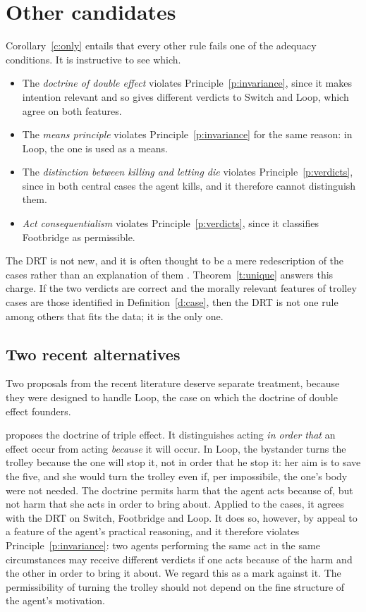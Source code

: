 \documentclass{situationist-preprint}
\begin{document}
\section{Other candidates}

Corollary~\ref{c:only} entails that every other rule fails one of the adequacy conditions. It is instructive to see which.

\begin{itemize}
\item The \emph{doctrine of double effect} violates Principle~\ref{p:invariance}, since it makes intention relevant and so gives different verdicts to Switch and Loop, which agree on both features.
\item The \emph{means principle} violates Principle~\ref{p:invariance} for the same reason: in Loop, the one is used as a means.
\item The \emph{distinction between killing and letting die} violates Principle~\ref{p:verdicts}, since in both central cases the agent kills, and it therefore cannot distinguish them.
\item \emph{Act consequentialism} violates Principle~\ref{p:verdicts}, since it classifies Footbridge as permissible.
\end{itemize}

The DRT is not new, and it is often thought to be a mere redescription of the cases rather than an explanation of them \citep{Kamm2007,Thomson2008}. Theorem~\ref{t:unique} answers this charge. If the two verdicts are correct and the morally relevant features of trolley cases are those identified in Definition~\ref{d:case}, then the DRT is not one rule among others that fits the data; it is the only one.

\subsection{Two recent alternatives}

Two proposals from the recent literature deserve separate treatment, because they were designed to handle Loop, the case on which the doctrine of double effect founders.

\citet{Kamm2007} proposes the doctrine of triple effect. It distinguishes acting \emph{in order that} an effect occur from acting \emph{because} it will occur. In Loop, the bystander turns the trolley because the one will stop it, not in order that he stop it: her aim is to save the five, and she would turn the trolley even if, per impossibile, the one's body were not needed. The doctrine permits harm that the agent acts because of, but not harm that she acts in order to bring about. Applied to the cases, it agrees with the DRT on Switch, Footbridge and Loop. It does so, however, by appeal to a feature of the agent's practical reasoning, and it therefore violates Principle~\ref{p:invariance}: two agents performing the same act in the same circumstances may receive different verdicts if one acts because of the harm and the other in order to bring it about. We regard this as a mark against it. The permissibility of turning the trolley should not depend on the fine structure of the agent's motivation.
\end{document}
